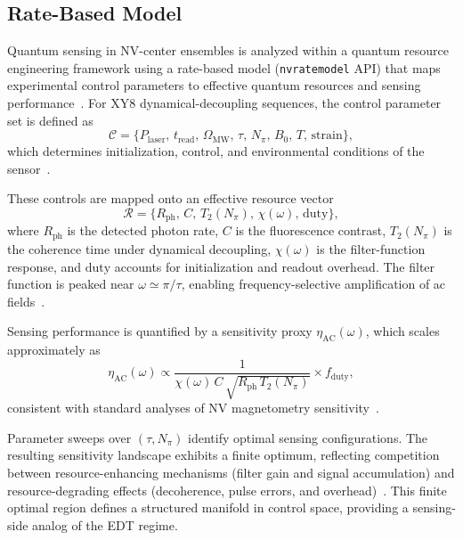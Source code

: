 \documentclass[twocolumn,10pt]{article}
\begin{document}
\subsection{Rate-Based Model}

Quantum sensing in NV-center ensembles is analyzed within a quantum resource engineering framework using a rate-based model (\texttt{nvratemodel} API) that maps experimental control parameters to effective quantum resources and sensing performance~\cite{NVRateModel2023,Degen2017,Barry2020}. For XY8 dynamical-decoupling sequences, the control parameter set is defined as
\begin{equation}
\mathcal{C} = \{P_{\mathrm{laser}},\, t_{\mathrm{read}},\, \Omega_{\mathrm{MW}},\, \tau,\, N_{\pi},\, B_0,\, T,\, \mathrm{strain}\},
\end{equation}
which determines initialization, control, and environmental conditions of the sensor~\cite{Casola2018}.

These controls are mapped onto an effective resource vector
\begin{equation}
\mathcal{R} = \{R_{\mathrm{ph}},\, C,\, T_2(N_{\pi}),\, \chi(\omega),\, \mathrm{duty}\},
\end{equation}
where $R_{\mathrm{ph}}$ is the detected photon rate, $C$ is the fluorescence contrast, $T_2(N_{\pi})$ is the coherence time under dynamical decoupling, $\chi(\omega)$ is the filter-function response, and $\mathrm{duty}$ accounts for initialization and readout overhead. The filter function is peaked near $\omega \simeq \pi/\tau$, enabling frequency-selective amplification of ac fields~\cite{Cywinski2008}.

Sensing performance is quantified by a sensitivity proxy $\eta_{\mathrm{AC}}(\omega)$, which scales approximately as
\begin{equation}
\eta_{\mathrm{AC}}(\omega) \propto \frac{1}{\chi(\omega)\,C\,\sqrt{R_{\mathrm{ph}}\,T_2(N_{\pi})}} \times f_{\mathrm{duty}},
\end{equation}
consistent with standard analyses of NV magnetometry sensitivity~\cite{Degen2017,Barry2020}.

Parameter sweeps over $(\tau, N_{\pi})$ identify optimal sensing configurations. The resulting sensitivity landscape exhibits a finite optimum, reflecting competition between resource-enhancing mechanisms (filter gain and signal accumulation) and resource-degrading effects (decoherence, pulse errors, and overhead)~\cite{Cywinski2008,Casola2018}. This finite optimal region defines a structured manifold in control space, providing a sensing-side analog of the EDT regime.
\end{document}
